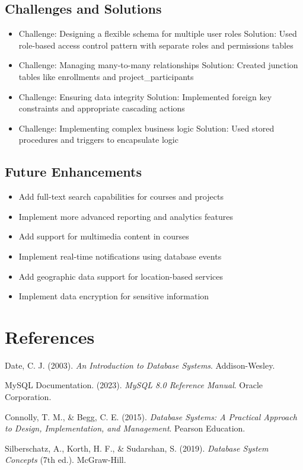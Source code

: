 \documentclass[12pt]{report}
\begin{document}
    \section{Challenges and Solutions}
    \begin{itemize}
        \item Challenge: Designing a flexible schema for multiple user roles
        Solution: Used role-based access control pattern with separate roles and permissions tables
        
        \item Challenge: Managing many-to-many relationships
        Solution: Created junction tables like enrollments and project\_participants
        
        \item Challenge: Ensuring data integrity
        Solution: Implemented foreign key constraints and appropriate cascading actions
        
        \item Challenge: Implementing complex business logic
        Solution: Used stored procedures and triggers to encapsulate logic
    \end{itemize}
    
    \section{Future Enhancements}
    \begin{itemize}
        \item Add full-text search capabilities for courses and projects
        \item Implement more advanced reporting and analytics features
        \item Add support for multimedia content in courses
        \item Implement real-time notifications using database events
        \item Add geographic data support for location-based services
        \item Implement data encryption for sensitive information
    \end{itemize}
    
    \chapter*{References}
    \begin{thebibliography}{9}
    Date, C. J. (2003). 
    \textit{An Introduction to Database Systems}. 
    Addison-Wesley.
    
    MySQL Documentation. (2023). 
    \textit{MySQL 8.0 Reference Manual}. 
    Oracle Corporation.
    
    Connolly, T. M., \& Begg, C. E. (2015). 
    \textit{Database Systems: A Practical Approach to Design, Implementation, and Management}. 
    Pearson Education.
    
    Silberschatz, A., Korth, H. F., \& Sudarshan, S. (2019). 
    \textit{Database System Concepts} (7th ed.). 
    McGraw-Hill.
    \end{thebibliography}
    
\end{document}
